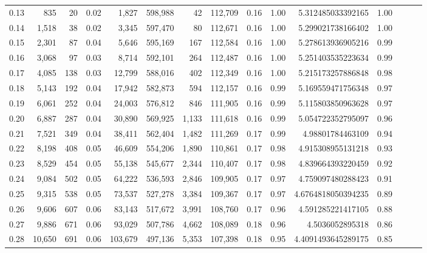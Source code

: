 \begin{tabular}{rrrrrrrrrrrrrrr}
0.13 &     835 &     20 &  0.02 &    1,827 &  598,988 &       42 &  112,709 &  0.16 &  1.00 &       5.312485033392165 &      1.00 \\
0.14 &   1,518 &     38 &  0.02 &    3,345 &  597,470 &       80 &  112,671 &  0.16 &  1.00 &       5.299021738166402 &      1.00 \\
0.15 &   2,301 &     87 &  0.04 &    5,646 &  595,169 &      167 &  112,584 &  0.16 &  1.00 &       5.278613936905216 &      0.99 \\
0.16 &   3,068 &     97 &  0.03 &    8,714 &  592,101 &      264 &  112,487 &  0.16 &  1.00 &       5.251403535223634 &      0.99 \\
0.17 &   4,085 &    138 &  0.03 &   12,799 &  588,016 &      402 &  112,349 &  0.16 &  1.00 &       5.215173257886848 &      0.98 \\
0.18 &   5,143 &    192 &  0.04 &   17,942 &  582,873 &      594 &  112,157 &  0.16 &  0.99 &       5.169559471756348 &      0.97 \\
0.19 &   6,061 &    252 &  0.04 &   24,003 &  576,812 &      846 &  111,905 &  0.16 &  0.99 &       5.115803850963628 &      0.97 \\
0.20 &   6,887 &    287 &  0.04 &   30,890 &  569,925 &    1,133 &  111,618 &  0.16 &  0.99 &       5.054722352795097 &      0.96 \\
0.21 &   7,521 &    349 &  0.04 &   38,411 &  562,404 &    1,482 &  111,269 &  0.17 &  0.99 &        4.98801784463109 &      0.94 \\
0.22 &   8,198 &    408 &  0.05 &   46,609 &  554,206 &    1,890 &  110,861 &  0.17 &  0.98 &       4.915308955131218 &      0.93 \\
0.23 &   8,529 &    454 &  0.05 &   55,138 &  545,677 &    2,344 &  110,407 &  0.17 &  0.98 &       4.839664393220459 &      0.92 \\
0.24 &   9,084 &    502 &  0.05 &   64,222 &  536,593 &    2,846 &  109,905 &  0.17 &  0.97 &       4.759097480288423 &      0.91 \\
0.25 &   9,315 &    538 &  0.05 &   73,537 &  527,278 &    3,384 &  109,367 &  0.17 &  0.97 &      4.6764818050394235 &      0.89 \\
0.26 &   9,606 &    607 &  0.06 &   83,143 &  517,672 &    3,991 &  108,760 &  0.17 &  0.96 &       4.591285221417105 &      0.88 \\
0.27 &   9,886 &    671 &  0.06 &   93,029 &  507,786 &    4,662 &  108,089 &  0.18 &  0.96 &         4.5036052895318 &      0.86 \\
0.28 &  10,650 &    691 &  0.06 &  103,679 &  497,136 &    5,353 &  107,398 &  0.18 &  0.95 &      4.4091493645289175 &      0.85 \\

\end{tabular}
